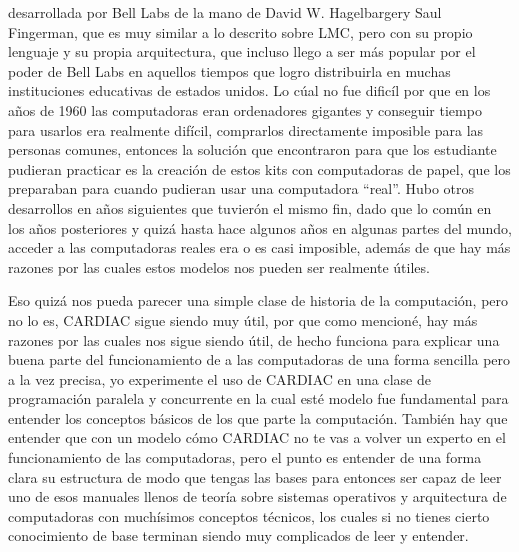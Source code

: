 \documentclass[letterpaper,12pt,oneside]{book}
\begin{document}
	desarrollada por Bell Labs de la mano de David W. Hagelbargery Saul Fingerman, que es
	muy similar a lo descrito sobre LMC, pero con su propio lenguaje y su propia arquitectura, que incluso llego a ser  más popular
	por el poder de Bell Labs en aquellos tiempos que logro distribuirla en muchas instituciones educativas de estados unidos.
	Lo cúal no fue dificíl por que en  los años de 1960 
	las computadoras eran ordenadores gigantes y conseguir tiempo para usarlos era realmente difícil, comprarlos directamente imposible para las personas
	comunes, entonces la solución que encontraron para que los estudiante pudieran practicar es la creación de estos kits con computadoras de papel, que los
	preparaban  para cuando pudieran usar una computadora ``real''.
	 Hubo otros desarrollos en años siguientes que tuvierón el mismo fin, dado que lo común en los años posteriores y quizá hasta hace algunos años en algunas partes del mundo, acceder a las computadoras reales era o es casi imposible,
	además de que hay más razones por las cuales estos modelos nos pueden ser realmente útiles.

	Eso quizá nos pueda parecer una simple clase de historia de la computación, pero no lo es, CARDIAC sigue siendo muy útil, por que como mencioné, hay más razones por las cuales nos sigue siendo útil, de hecho
	funciona para explicar una buena parte del funcionamiento de a las computadoras de una forma sencilla pero a la vez precisa, yo experimente el uso de CARDIAC en una clase de programación paralela y concurrente en la 
	cual esté modelo
	fue fundamental para entender los conceptos básicos de los que parte la computación. También hay que entender que con un modelo cómo CARDIAC no te vas a volver un experto en 
	el funcionamiento de las computadoras,
	pero el punto es entender de una forma clara su estructura de modo que tengas las bases para entonces ser capaz de leer uno de esos manuales llenos de teoría sobre sistemas
	operativos y arquitectura de computadoras con muchísimos conceptos técnicos, los cuales si no tienes cierto conocimiento de base terminan siendo muy complicados de leer y entender.
	
\end{document}
